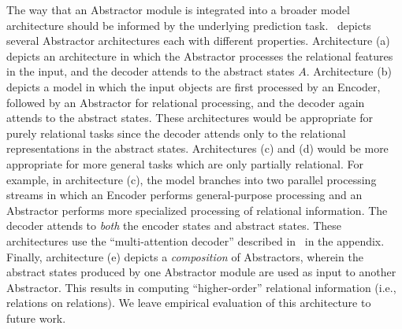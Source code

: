 The way that an Abstractor module is integrated into a broader model architecture should be informed by the underlying prediction task.~ depicts several Abstractor architectures each with different properties. Architecture (a) depicts an architecture in which the Abstractor processes the relational features in the input, and the decoder attends to the abstract states $A$. Architecture (b) depicts a model in which the input objects are first processed by an Encoder, followed by an Abstractor for relational processing, and the decoder again attends to the abstract states. These architectures would be appropriate for purely relational tasks since the decoder attends only to the relational representations in the abstract states. Architectures (c) and (d) would be more appropriate for more general tasks which are only partially relational. For example, in architecture (c), the model branches into two parallel processing streams in which an Encoder performs general-purpose processing and an Abstractor performs more specialized processing of relational information.
The decoder attends to \textit{both} the encoder states and abstract states.
These architectures use the ``multi-attention decoder'' described in~ in the appendix.
Finally, architecture (e) depicts a \textit{composition} of Abstractors, wherein the abstract states produced by one Abstractor module are used as input to another Abstractor. This results in computing ``higher-order'' relational information (i.e., relations on relations).
We leave empirical evaluation of this architecture to future work. 